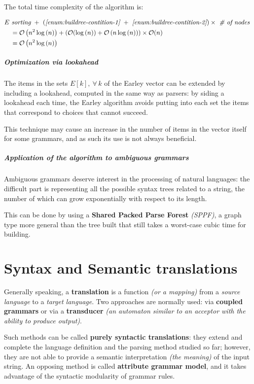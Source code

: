 \documentclass[english]{article}
\begin{document}
The total time complexity of the algorithm is:

\begin{align*}
   & E \ \textit{sorting} \ + \ \left(\textit{\ref{enum:buildree-contition-1}} \ + \ \textit{\ref{enum:buildree-contition-2}} \right) \times \ \textit{\# of nodes} \ \\
   & \quad = \mathcal{O}\left( n^2 \log{(n)} \right) + \left( \mathcal{O}(\log{(n)}) + \mathcal{O}\left( n \log{(n)} \right) \right) \times \mathcal{O}(n)            \\
   & \quad = \mathcal{O}\left( n^2 \log{(n)} \right)
\end{align*}

\subparagraph*{Optimization via lookahead}

The items in the sets \(E[k], \ \forall \, k\) of the Earley vector can be extended by including a lookahead, computed in the same way as \elro parsers:
by siding a lookahead each time, the Earley algorithm avoids putting into each set the items that correspond to choices that cannot succeed.

This technique may cause an increase in the number of items in the vector itself for some grammars, and as such its use is not always beneficial.

\subparagraph*{Application of the algorithm to ambiguous grammars}

Ambiguous grammars deserve interest in the processing of natural languages:
the difficult part is representing all the possible syntax trees related to a string, the number of which can grow exponentially with respect to its length.

This can be done by using a \textbf{Shared Packed Parse Forest} \textit{(SPPF)}, a graph type more general than the tree built that still takes a worst-case cubic time for building.

\clearpage

\section{Syntax and Semantic translations}

Generally speaking, a \textbf{translation} is a function \textit{(or a mapping)} from a \textit{source language} to a \textit{target language}.
Two approaches are normally used:
via \textbf{coupled grammars} or via a \textbf{transducer} \textit{(an automaton similar to an acceptor with the ability to produce output)}.

Such methods can be called \textbf{purely syntactic translations}:
they extend and complete the language definition and the parsing method studied so far; however, they are not able to provide a semantic interpretation \textit{(the meaning)} of the input string.
An opposing method is called \textbf{attribute grammar model}, and it takes advantage of the syntactic modularity of grammar rules.
\end{document}
